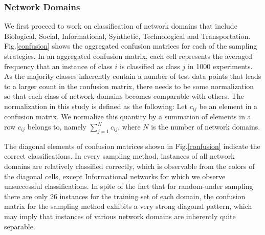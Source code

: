 \documentclass{article}
\begin{document}
 
\subsubsection{Network Domains} 
We first proceed to work on classification of network domains that include Biological, Social, Informational, Synthetic, Technological and Transportation. Fig.\ref{confusion} shows the aggregated confusion matrices for each of the sampling strategies. In an aggregated confusion matrix, each cell represents the averaged frequency that an instance of class $i$ is classified as class $j$ in 1000 experiments. As the majority classes inherently contain a number of test data points that leads to a larger count in the confusion matrix, there needs to be some normalization so that each class of network domains becomes comparable with others. The normalization in this study is defined as the following: Let $c_{ij}$ be an element in a confusion matrix. We normalize this quantity by a summation of elements in a row $c_{ij}$ belongs to, namely $\sum_{j=1}^N c_{ij}$, where $N$ is the number of network domains. 

The diagonal elements of confusion matrices shown in Fig.\ref{confusion} indicate the correct classifications. In every sampling method, instances of all network domains are relatively classified correctly, which is observable from the colors of the diagonal cells, except Informational networks for which we observe unsuccessful classifications. In spite of the fact that for random-under sampling there are only 26 instances for the training set of each domain, the confusion matrix for the sampling method exhibits a very strong diagonal pattern, which may imply that instances of various network domains are inherently quite separable.
\end{document}

